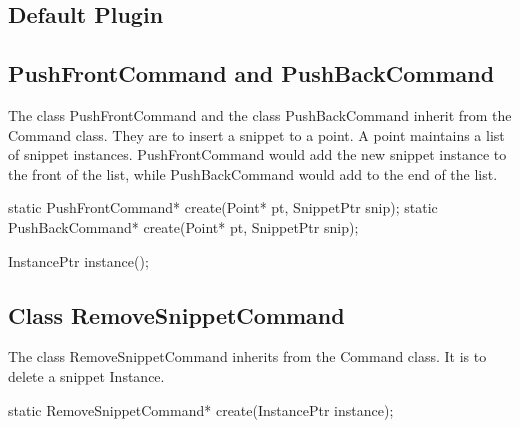 
\subsection{Default Plugin}
\label{sec:default-plugin}

\subsection{PushFrontCommand and PushBackCommand}
\label{sec:push-commands}


The class PushFrontCommand and the class PushBackCommand inherit from the
Command class. They are to insert a snippet to a point. A point maintains a
list of snippet instances. PushFrontCommand would add the new snippet instance
to the front of the list, while PushBackCommand would add to the end of the
list.


\begin{apient}
static PushFrontCommand* create(Point* pt, SnippetPtr snip);
static PushBackCommand* create(Point* pt, SnippetPtr snip);
\end{apient}


\begin{apient}
InstancePtr instance();
\end{apient}


\subsection{Class RemoveSnippetCommand}
\label{sec:removesnippetcommand}


The class RemoveSnippetCommand inherits from the Command class. It is to delete
a snippet Instance.


\begin{apient}
static RemoveSnippetCommand* create(InstancePtr instance);
\end{apient}


